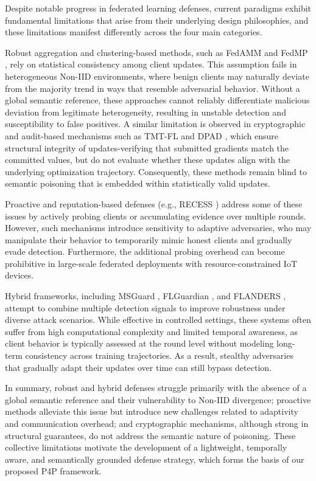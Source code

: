 Despite notable progress in federated learning defenses, current paradigms exhibit fundamental limitations that arise from their underlying design philosophies, and these limitations manifest differently across the four main categories. 

Robust aggregation and clustering-based methods, such as FedAMM \cite{11175562} and FedMP \cite{ZHAO2025110990}, rely on statistical consistency among client updates. This assumption fails in heterogeneous Non-IID environments, where benign clients may naturally deviate from the majority trend in ways that resemble adversarial behavior. Without a global semantic reference, these approaches cannot reliably differentiate malicious deviation from legitimate heterogeneity, resulting in unstable detection and susceptibility to false positives. A similar limitation is observed in cryptographic and audit-based mechanisms such as TMT-FL \cite{10812212} and DPAD \cite{BASAK2025109893}, which ensure structural integrity of updates-verifying that submitted gradients match the committed values, but do not evaluate whether these updates align with the underlying optimization trajectory. Consequently, these methods remain blind to semantic poisoning that is embedded within statistically valid updates. 

Proactive and reputation-based defenses (e.g., RECESS \cite{yan2025recess}) address some of these issues by actively probing clients or accumulating evidence over multiple rounds. However, such mechanisms introduce sensitivity to adaptive adversaries, who may manipulate their behavior to temporarily mimic honest clients and gradually evade detection. Furthermore, the additional probing overhead can become prohibitive in large-scale federated deployments with resource-constrained IoT devices. 

Hybrid frameworks, including MSGuard \cite{yang2025msguard}, FLGuardian \cite{zhou2025flguardian}, and FLANDERS \cite{11164345}, attempt to combine multiple detection signals to improve robustness under diverse attack scenarios. While effective in controlled settings, these systems often suffer from high computational complexity and limited temporal awareness, as client behavior is typically assessed at the round level without modeling long-term consistency across training trajectories. As a result, stealthy adversaries that gradually adapt their updates over time can still bypass detection. 

In summary, robust and hybrid defenses struggle primarily with the absence of a global semantic reference and their vulnerability to Non-IID divergence; proactive methods alleviate this issue but introduce new challenges related to adaptivity and communication overhead; and cryptographic mechanisms, although strong in structural guarantees, do not address the semantic nature of poisoning. These collective limitations motivate the development of a lightweight, temporally aware, and semantically grounded defense strategy, which forms the basis of our proposed P4P framework.